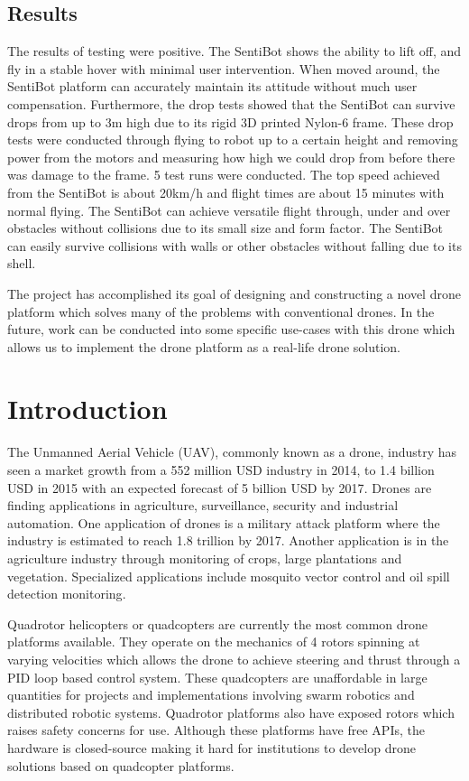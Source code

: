 \documentclass[12pt]{article}
\begin{document}
\subsection{Results}

The results of testing were positive. The SentiBot shows the ability to lift off, and fly in a stable hover with minimal user intervention. When moved around, the SentiBot platform can accurately maintain its attitude without much user compensation. Furthermore, the drop tests showed that the SentiBot can survive drops from up to 3m high due to its rigid 3D printed Nylon-6 frame. These drop tests were conducted through flying to robot up to a certain height and removing power from the motors and measuring how high we could drop from before there was damage to the frame. 5 test runs were conducted. The top speed achieved from the SentiBot is about 20km/h and flight times are about 15 minutes with normal flying. The SentiBot can achieve versatile flight through, under and over obstacles without collisions due to its small size and form factor. The SentiBot can easily survive collisions with walls or other obstacles without falling due to its shell.

The project has accomplished its goal of designing and constructing a novel drone platform which solves many of the problems with conventional drones. In the future, work can be conducted into some specific use-cases with this drone which allows us to implement the drone platform as a real-life drone solution.

\section{Introduction}

The Unmanned Aerial Vehicle (UAV), commonly known as a drone, industry has seen a market growth from a 552 million USD industry in 2014, to 1.4 billion USD in 2015 with an expected forecast of 5 billion USD by 2017\cite{legalandsocial}. Drones are finding applications in agriculture, surveillance, security and industrial automation. One application of drones is a military attack platform where the industry is estimated to reach 1.8 trillion by 2017\cite{dronewars}. Another application is in the agriculture industry through monitoring of crops, large plantations and vegetation\cite{agriculture}. Specialized applications include mosquito vector control\cite{mosquito} and oil spill detection monitoring\cite{oilspill}. 

Quadrotor helicopters or quadcopters are currently the most common drone platforms available. They operate on the mechanics of 4 rotors spinning at varying velocities which allows the drone to achieve steering and thrust through a PID loop based control system\cite{Multiwii}. These quadcopters are unaffordable in large quantities for projects and implementations involving swarm robotics and distributed robotic systems. Quadrotor platforms also have exposed rotors which raises safety concerns for use. Although these platforms have free APIs, the hardware is closed-source making it hard for institutions to develop drone solutions based on quadcopter platforms.
\end{document}
